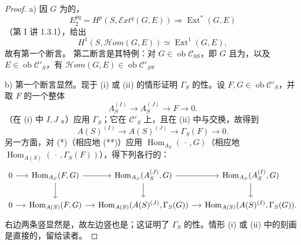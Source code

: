 \begin{proof}
a) 因 $G$ 为的，
\[
E_2^{pq}=H^p(S,\mathcal Ext^q(G,E))\Longrightarrow\operatorname{Ext}^*(G,E)
\]
（第 I 讲 1.3.1），给出
\[
H^1(S,\mathcal Hom(G,E))\simeq\operatorname{Ext}^1(G,E),
\]
故有第一个断言。
第二断言是其特例：对 $G\in\operatorname{ob}\mathcal C_{0S}$，即 $G$ 且为，以及 $E\in\operatorname{ob}\mathcal C'_S$，有 $\mathcal Hom(G,E)\in\operatorname{ob}\mathcal C'_S$。

b) 第一个断言显然。现于 (i) 或 (ii) 的情形证明 $\Gamma_S$ 的性。设 $F,G\in\operatorname{ob}\mathcal C'_S$，并取 $F$ 的一个整体
\[
A_S^{(I)}\longrightarrow A_S^{(J)}\longrightarrow F\longrightarrow0.\tag{*}
\]
（在 (i) 中 $I,J$ 。）应用 $\Gamma_S$；它在 $\mathcal C'_S$ 上，且在 (ii) 中与交换，故得到
\[
A(S)^{(I)}\longrightarrow A(S)^{(J)}\longrightarrow\Gamma_S(F)\longrightarrow0.\tag{**}
\]
另一方面，对 (*)（相应地 (**)）应用 $\operatorname{Hom}_{A_S}(\,\cdot\,,G)$（相应地 $\operatorname{Hom}_{A(S)}(\,\cdot\,,\Gamma_S(F))$），得下列各行的：
\[
\begin{tikzcd}[column sep=small]
0\ar[r]&\operatorname{Hom}_{A_S}(F,G)\ar[r]\ar[d]&\operatorname{Hom}_{A_S}(A_S^{(J)},G)\ar[r]\ar[d]&\operatorname{Hom}_{A_S}(A_S^{(I)},G)\ar[d]\\
0\ar[r]&\operatorname{Hom}_{A(S)}(F,G)\ar[r]&\operatorname{Hom}_{A(S)}(A(S)^{(J)},\Gamma_S(G))\ar[r]&\operatorname{Hom}_{A(S)}(A(S)^{(I)},\Gamma_S(G)).
\end{tikzcd}
\]
右边两条竖显然是，故左边竖也是；这证明了 $\Gamma_S$ 的性。情形 (i) 或 (ii) 中的刻画是直接的，留给读者。
\end{proof}
